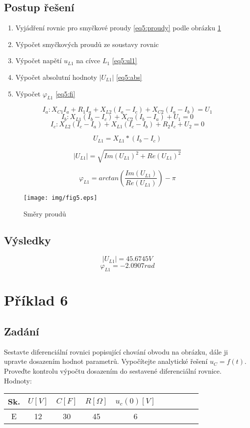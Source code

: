 \documentclass[12pt,a4paper,titlepage,final]{article}
\begin{document}
\subsection{Postup řešení}
\begin{enumerate}
\item Vyjádření rovnic pro smyčkové proudy \ref{eq5:proudy} podle obrázku \ref{fig:5}
\item Výpočet smyčkových proudů ze soustavy rovnic
\item Výpočet napětí $u_{L1}$ na cívce $L_{1}$ \ref{eq5:ul1}
\item Výpočet absolutní hodnoty $|U_{L1}|$ \ref{eq5:abs}
\item Výpočet $\varphi_{L1}$ \ref{eq5:fi}
\end{enumerate}
\begin{equation}\label{eq5:proudy}
I_a: X_{C1}I_a+R_1I_a+X_{L2}(I_a-I_c)+X_{C2}(I_a-I_b) = U_1
\end{equation}
\[I_b: X_{L1}(I_b-I_c)+X_{C2}(I_b-I_a)+U_1=0\]
\[I_c: X_{L2}(I_c-I_a)+X_{L1}(I_c-I_b)+R_2I_c+U_2=0\]

\begin{equation}\label{eq5:ul1}
U_{L1} = X_{L1}*(I_b-I_c)
\end{equation}

\begin{equation}\label{eq5:abs}
|U_{L1}| = \sqrt{Im(U_{L1})^2+Re(U_{L1})^2}
\end{equation}

\begin{equation}\label{eq5:fi}
\varphi_{L1} = arctan(\frac{Im(U_{L1})}{Re(U_{L1})})-\pi
\end{equation}
\begin{figure}[h]
  \centering
  \texttt{[image: img/fig5.eps]}
  \caption{Směry proudů}
  \label{fig:5}
\end{figure}
\subsection{Výsledky}
\[|U_{L1}| = 45.6745V\]
\[\varphi_{L1} = -2.0907rad\]
\section{Příklad 6}
\subsection{Zadání}
Sestavte diferenciální rovnici popisující chování obvodu na obrázku, dále ji upravte dosazením hodnot parametrů. Vypočítejte analytické řešení $u_C=f(t)$.
Proveďte kontrolu výpočtu dosazením do sestavené diferenciální rovnice.\\
Hodnoty:\\
\begin{tabular}{|c|c|c|c|c|c|c|c|c|c|}
\hline
Sk. & $U [V]$ & $C[F]$ & $R[\Omega]$ & $u_c(0) [V]$\\
\hline
E & 12 & 30 & 45 & 6\\
\hline
\end{tabular}
\end{document}
